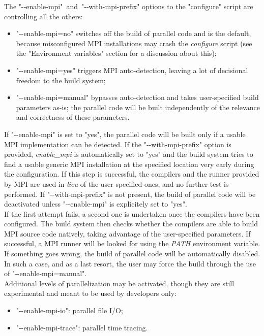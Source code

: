 The "\hbox{-{-}enable-mpi" and "-{-}}with-mpi-prefix" options to the "configure"
script are controlling all the others:
\begin{itemize}
 \item
 "-{-}enable-mpi=no" switches off the build of parallel code and is the
 default, because misconfigured MPI installations may crash the
 \textit{configure} script (see the "Environment variables" section for
 a discussion about this);
 \item
 "-{-}enable-mpi=yes" triggers MPI auto-detection, leaving a lot of
 decisional freedom to the build system;
 \item
 "-{-}enable-mpi=manual" bypasses auto-detection and takes user-specified
 build parameters as-is; the parallel code will be built independently
 of the relevance and correctness of these parameters.
\end{itemize}

If "-{-}enable-mpi" is set to "yes", the parallel code will be built only if
a usable MPI implementation can be detected. If the "-{-}with-mpi-prefix"
option is provided, \textit{enable\_mpi} is automatically set to "yes"
and the build system tries to find a usable generic MPI installation at
the specified location very early during the configuration. If this step
is successful, the compilers and the runner provided by MPI are used in
\textit{lieu} of the user-specified ones, and no further test is
performed. If "-{-}with-mpi-prefix" is not present, the build of parallel
code will be deactivated unless "-{-}enable-mpi" is explicitely set to
"yes".
\\

If the first attempt fails, a second one is undertaken once the
compilers have been configured. The build system then checks whether the
compilers are able to build MPI source code natively, taking advantage
of the user-specified parameters. If successful, a MPI runner will be
looked for using the \textit{PATH} environment variable. If something
goes wrong, the build of parallel code will be automatically disabled.
In such a case, and as a last resort, the user may force the build
through the use of "-{-}enable-mpi=manual".
\\

Additional levels of parallelization may be activated, though they
are still experimental and meant to be used by developers only:
\begin{itemize}
 \item
 "-{-}enable-mpi-io": parallel file I/O;
 \item
 "-{-}enable-mpi-trace": parallel time tracing.
\end{itemize}

